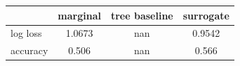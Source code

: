 \begin{tabular}{lccc}
\toprule
 & marginal & tree baseline & surrogate \\
\midrule
log loss & 1.0673 & nan & 0.9542 \\
accuracy & 0.506 & nan & 0.566 \\
\bottomrule
\end{tabular}
